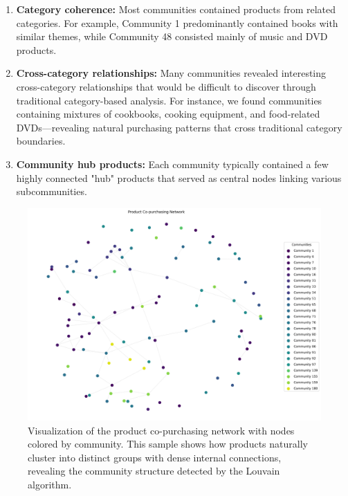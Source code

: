\documentclass[conference]{IEEEtran}
\begin{document}
\begin{enumerate}
    \item \textbf{Category coherence:} Most communities contained products from related categories. For example, Community 1 predominantly contained books with similar themes, while Community 48 consisted mainly of music and DVD products.
    
    \item \textbf{Cross-category relationships:} Many communities revealed interesting cross-category relationships that would be difficult to discover through traditional category-based analysis. For instance, we found communities containing mixtures of cookbooks, cooking equipment, and food-related DVDs—revealing natural purchasing patterns that cross traditional category boundaries.
    
    \item \textbf{Community hub products:} Each community typically contained a few highly connected "hub" products that served as central nodes linking various subcommunities.
\end{enumerate}

\begin{figure}[t]
    \centering
    \includegraphics[width=\columnwidth]{fig/copurchase_graph.png}
    \caption{Visualization of the product co-purchasing network with nodes colored by community. This sample shows how products naturally cluster into distinct groups with dense internal connections, revealing the community structure detected by the Louvain algorithm.}
    \label{fig:copurchase_graph}
\end{figure}
\end{document}
